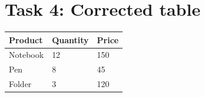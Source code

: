 \documentclass{article}
\begin{document}
\section*{Task 4: Corrected table}

\begin{tabular}{lll}
\hline
Product & Quantity & Price \\
\hline
Notebook & 12 & 150 \\
Pen & 8 & 45 \\
Folder & 3 & 120 \\
\hline
\end{tabular}
\end{document}
